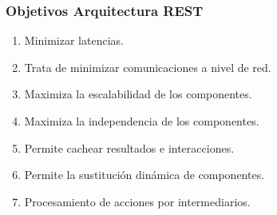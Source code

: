 \documentclass[a4paper,slidestop,xcolor=pst,blue]{beamer}
\begin{document}
\begin{frame}[c]
	\frametitle{Objetivos Arquitectura REST}
    \begin{enumerate}
        \item Minimizar latencias.
        \item Trata de minimizar comunicaciones a nivel de red.
        \item Maximiza la escalabilidad de los componentes.
        \item Maximiza la independencia de los componentes.

        \item Permite cachear resultados e interacciones.
        \item Permite la sustitución dinámica de componentes.
        \item Procesamiento de acciones por intermediarios.
    \end{enumerate}
\end{frame}
%
%
%
\end{document}
